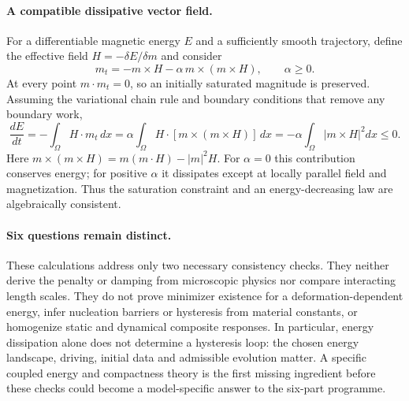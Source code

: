 \documentclass[11pt]{article}
\begin{document}
\paragraph{A compatible dissipative vector field.}
For a differentiable magnetic energy $E$ and a sufficiently smooth trajectory, define the effective field $H=-\delta E/\delta m$ and consider
\[
 m_t=-m\times H-\alpha\,m\times(m\times H),\qquad\alpha\geq0.
\]
At every point $m\cdot m_t=0$, so an initially saturated magnitude is preserved. Assuming the variational chain rule and boundary conditions that remove any boundary work,
\[
 \frac{dE}{dt}=-\int_\Omega H\cdot m_t\,dx
 =\alpha\int_\Omega H\cdot[m\times(m\times H)]\,dx
 =-\alpha\int_\Omega|m\times H|^2dx\leq0.
\]
Here $m\times(m\times H)=m(m\cdot H)-|m|^2H$. For $\alpha=0$ this contribution conserves energy; for positive $\alpha$ it dissipates except at locally parallel field and magnetization. Thus the saturation constraint and an energy-decreasing law are algebraically consistent.

\paragraph{Six questions remain distinct.}
These calculations address only two necessary consistency checks. They neither derive the penalty or damping from microscopic physics nor compare interacting length scales. They do not prove minimizer existence for a deformation-dependent energy, infer nucleation barriers or hysteresis from material constants, or homogenize static and dynamical composite responses. In particular, energy dissipation alone does not determine a hysteresis loop: the chosen energy landscape, driving, initial data and admissible evolution matter. A specific coupled energy and compactness theory is the first missing ingredient before these checks could become a model-specific answer to the six-part programme.
\end{document}
